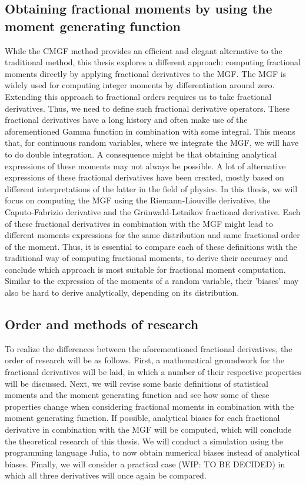 \subsection{Obtaining fractional moments by using the moment generating function}
While the CMGF method provides an efficient  and elegant alternative to the traditional method, this thesis explores a different approach: computing fractional moments directly by applying fractional derivatives to the MGF. The MGF is widely used for computing integer moments by differentiation around zero. Extending this approach to fractional orders requires us to take fractional derivatives. Thus, we need to define such fractional derivative operators. These fractional derivatives have a long history and often make use of the aforementioned Gamma function in combination with some integral. This means that, for continuous random variables, where we integrate the MGF, we will have to do double integration. A consequence might be that obtaining analytical expressions of these moments may not always be possible. A lot of alternative expressions of these fractional derivatives have been created, mostly based on different interpretations of the latter in the field of physics. In this thesis, we will focus on computing the MGF using the Riemann-Liouville derivative, the Caputo-Fabrizio derivative and the Grünwald-Letnikov fractional derivative. Each of these fractional derivatives in combination with the MGF might lead to different moments expressions for the same distribution and same fractional order of the moment. Thus, it is essential to compare each of these definitions with the traditional way of computing fractional moments, to derive their accuracy and conclude which approach is most suitable for fractional moment computation. Similar to the expression of the moments of a random variable, their 'biases' may also be hard to derive analytically, depending on its distribution.

\subsection{Order and methods of research}
To realize the differences between the aforementioned fractional derivatives, the order of research will be as follows. First, a mathematical groundwork for the fractional derivatives will be laid, in which a number of their respective properties will be discussed. Next, we will revise some basic definitions of statistical moments and the moment generating function and see how some of these properties change when considering fractional moments in combination with the moment generating function. If possible, analytical biases for each fractional derivative in combination with the MGF will be computed, which will conclude the theoretical research of this thesis. We will conduct a simulation using the programming language Julia, to now obtain numerical biases instead of analytical biases. Finally, we will consider a practical case (WIP: TO BE DECIDED) in which all three derivatives will once again be compared.